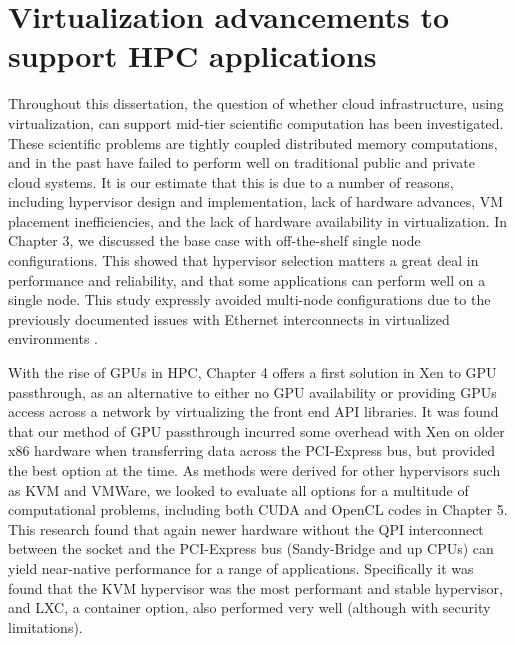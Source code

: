 
\chapter{Virtualization advancements to support HPC applications}
\label{chap:future-work}

Throughout this dissertation, the question of whether cloud infrastructure, using virtualization, can support mid-tier scientific computation has been investigated. These scientific problems are tightly coupled distributed memory computations, and in the past have failed to perform well on traditional public and private cloud systems. It is our estimate that this is due to a number of reasons, including hypervisor design and implementation, lack of hardware advances, VM placement inefficiencies, and the lack of hardware availability in virtualization. In Chapter 3, we discussed the base case with off-the-shelf single node configurations.  This showed that hypervisor selection matters a great deal in performance and reliability, and that some applications can perform well on a single node. This study expressly avoided multi-node configurations due to the previously documented issues with Ethernet interconnects in virtualized environments \cite{MagellanFinal}. 

With the rise of GPUs in HPC, Chapter 4 offers a first solution in Xen to GPU passthrough, as an alternative to either no GPU availability or providing GPUs access across a network by virtualizing the front end API libraries. It was found that our method of GPU passthrough incurred some overhead with Xen on older x86 hardware when transferring data across the PCI-Express bus, but provided the best option at the time.  As methods were derived for other hypervisors such as KVM and VMWare, we looked to evaluate all options for a multitude of computational problems, including both CUDA and OpenCL codes in Chapter 5. This research found that again newer hardware without the QPI interconnect between the socket and the PCI-Express bus (Sandy-Bridge and up CPUs) can yield near-native performance for a range of applications.  Specifically it was found that the KVM hypervisor was the most performant and stable hypervisor, and LXC, a container option, also performed very well (although with security limitations).  

